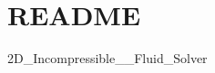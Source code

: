\chapter{README}
\hypertarget{md__incompressible___solver_2_b_q_p-_incompressible___c_f_d___solver_2_r_e_a_d_m_e}{}\label{md__incompressible___solver_2_b_q_p-_incompressible___c_f_d___solver_2_r_e_a_d_m_e}
2D\+\_\+\+Incompressible\+\_\+\_\+\+Fluid\+\_\+\+Solver 